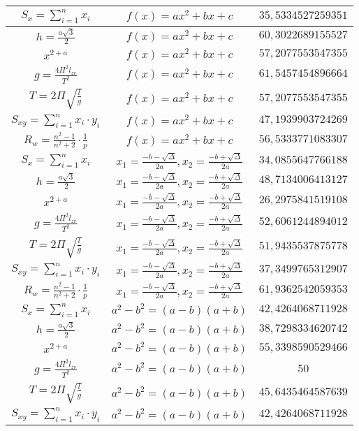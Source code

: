 \documentclass{article}
\begin{document}
\begin{flushleft}
\begin{longtable}{|c|c|c|}
$S_x=\sum_{i=1}^{n}x_i$ & $f(x)=ax^2+bx+c$ & $35,5334527259351$ \\ \hline 
$h=\frac{a\sqrt{3}}{2}$ & $f(x)=ax^2+bx+c$ & $60,3022689155527$ \\ \hline 
$x^{2+a}$ & $f(x)=ax^2+bx+c$ & $57,2077553547355$ \\ \hline 
$g=\frac{4\Pi ^2l_{zr}}{T^2}$ & $f(x)=ax^2+bx+c$ & $61,5457454896664$ \\ \hline 
$T=2\Pi \sqrt{\frac{l}{g}}$ & $f(x)=ax^2+bx+c$ & $57,2077553547355$ \\ \hline 
$S_{xy}=\sum_{i=1}^{n}x_i\cdot y_i$ & $f(x)=ax^2+bx+c$ & $47,1939903724269$ \\ \hline 
$R_w=\frac{n^2-1}{n^2+2}\cdot \frac{1}{p}$ & $f(x)=ax^2+bx+c$ & $56,5333771083307$ \\ \hline 
$S_x=\sum_{i=1}^{n}x_i$ & $x_1=\frac{-b-\sqrt{\Delta }}{2a},x_2=\frac{-b+\sqrt{\Delta }}{2a}$ & $34,0855647766188$ \\ \hline 
$h=\frac{a\sqrt{3}}{2}$ & $x_1=\frac{-b-\sqrt{\Delta }}{2a},x_2=\frac{-b+\sqrt{\Delta }}{2a}$ & $48,7134006413127$ \\ \hline 
$x^{2+a}$ & $x_1=\frac{-b-\sqrt{\Delta }}{2a},x_2=\frac{-b+\sqrt{\Delta }}{2a}$ & $26,2975841519108$ \\ \hline 
$g=\frac{4\Pi ^2l_{zr}}{T^2}$ & $x_1=\frac{-b-\sqrt{\Delta }}{2a},x_2=\frac{-b+\sqrt{\Delta }}{2a}$ & $52,6061244894012$ \\ \hline 
$T=2\Pi \sqrt{\frac{l}{g}}$ & $x_1=\frac{-b-\sqrt{\Delta }}{2a},x_2=\frac{-b+\sqrt{\Delta }}{2a}$ & $51,9435537875778$ \\ \hline 
$S_{xy}=\sum_{i=1}^{n}x_i\cdot y_i$ & $x_1=\frac{-b-\sqrt{\Delta }}{2a},x_2=\frac{-b+\sqrt{\Delta }}{2a}$ & $37,3499765312907$ \\ \hline 
$R_w=\frac{n^2-1}{n^2+2}\cdot \frac{1}{p}$ & $x_1=\frac{-b-\sqrt{\Delta }}{2a},x_2=\frac{-b+\sqrt{\Delta }}{2a}$ & $61,9362542059353$ \\ \hline 
$S_x=\sum_{i=1}^{n}x_i$ & $a^2-b^2=(a-b)(a+b)$ & $42,4264068711928$ \\ \hline 
$h=\frac{a\sqrt{3}}{2}$ & $a^2-b^2=(a-b)(a+b)$ & $38,7298334620742$ \\ \hline 
$x^{2+a}$ & $a^2-b^2=(a-b)(a+b)$ & $55,3398590529466$ \\ \hline 
$g=\frac{4\Pi ^2l_{zr}}{T^2}$ & $a^2-b^2=(a-b)(a+b)$ & $50$ \\ \hline 
$T=2\Pi \sqrt{\frac{l}{g}}$ & $a^2-b^2=(a-b)(a+b)$ & $45,6435464587639$ \\ \hline 
$S_{xy}=\sum_{i=1}^{n}x_i\cdot y_i$ & $a^2-b^2=(a-b)(a+b)$ & $42,4264068711928$ \\ \hline 

\end{longtable}
\end{flushleft}
\end{document}
